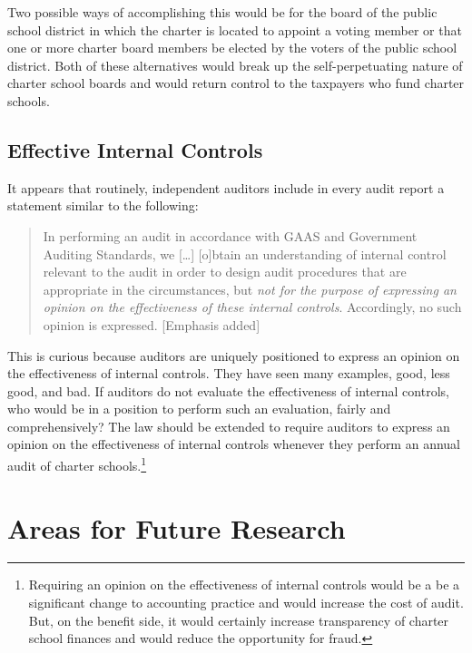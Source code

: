 Two possible ways of accomplishing this would be for the board of the public school district in which the charter is located to appoint a voting member or that one or more charter board members be elected by the voters of the public school district. Both of these alternatives would break up the self-perpetuating nature of charter school boards and would return control to the taxpayers who fund charter schools.

\newpage
\subsection{Effective Internal Controls}%
\label{sec:effect-intern-contr}\indent%

It appears that routinely, independent auditors include in every audit report a statement similar to the following:
\begin{quotation}\noindent
  In performing an audit in accordance with GAAS and Government Auditing Standards, we [\ldots]
  [o]btain an understanding of internal control relevant to the audit in order to design audit procedures that are appropriate in the circumstances, but \textit{not for the purpose of expressing an opinion on the effectiveness of these internal controls}. Accordingly, no such opinion is expressed. [Emphasis added]
\end{quotation}
This is curious because auditors are uniquely positioned to express an opinion on the effectiveness of internal controls. They have seen many examples, good, less good, and bad. If auditors do not evaluate the effectiveness of internal controls, who would be in a position to perform such an evaluation, fairly and comprehensively? The law should be extended to require auditors to express an opinion on the effectiveness of internal controls whenever they perform an annual audit of charter schools.\footnote{Requiring an opinion on the effectiveness of internal controls would be a be a significant change to accounting practice and would increase the cost of audit. But, on the benefit side, it would certainly increase transparency of charter school finances and would reduce the opportunity for fraud.}

\section{Areas for Future Research}%
\label{sec:areas-future-rese}\indent%

